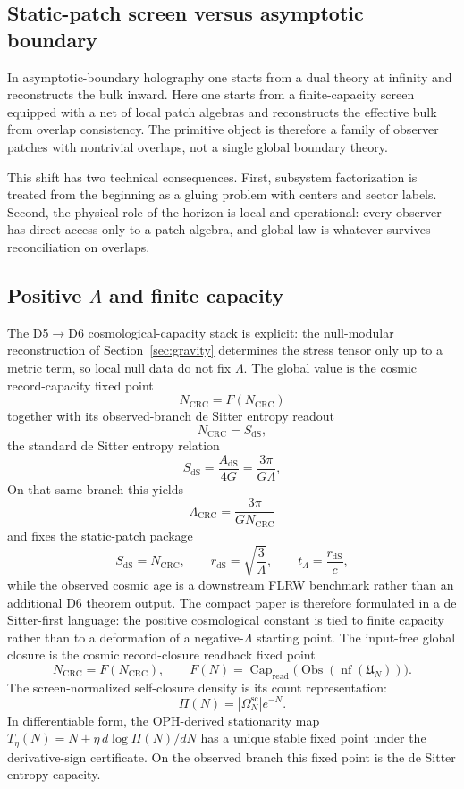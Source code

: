 \documentclass[11pt]{article}
\begin{document}
\subsection{Static-patch screen versus asymptotic boundary}

In asymptotic-boundary holography one starts from a dual theory at infinity and reconstructs the bulk inward. Here one starts from a finite-capacity screen equipped with a net of local patch algebras and reconstructs the effective bulk from overlap consistency. The primitive object is therefore a family of observer patches with nontrivial overlaps, not a single global boundary theory.

This shift has two technical consequences. First, subsystem factorization is treated from the beginning as a gluing problem with centers and sector labels. Second, the physical role of the horizon is local and operational: every observer has direct access only to a patch algebra, and global law is whatever survives reconciliation on overlaps.

\subsection{Positive $\Lambda$ and finite capacity}

The D5\(\to\)D6 cosmological-capacity stack is explicit: the null-modular reconstruction of Section~\ref{sec:gravity} determines the stress tensor only up to a metric term, so local null data do not fix $\Lambda$. The global value is the cosmic record-capacity fixed point
\[
N_{\mathrm{CRC}}=F(N_{\mathrm{CRC}})
\]
together with its observed-branch de Sitter entropy readout
\[
N_{\mathrm{CRC}}=S_{\mathrm{dS}},
\]
\noindent the standard de Sitter entropy relation
\[
S_{\mathrm{dS}}=\frac{A_{\mathrm{dS}}}{4G}=\frac{3\pi}{G\Lambda},
\]
On that same branch this yields
\[
\Lambda_{\mathrm{CRC}}=\frac{3\pi}{G N_{\mathrm{CRC}}}
\]
and fixes the static-patch package
\[
S_{\mathrm{dS}}=N_{\mathrm{CRC}},
\qquad
r_{\mathrm{dS}}=\sqrt{\frac{3}{\Lambda}},
\qquad
t_\Lambda=\frac{r_{\mathrm{dS}}}{c},
\]
while the observed cosmic age is a downstream FLRW benchmark rather than an additional D6 theorem output. The compact paper is therefore formulated in a de Sitter-first language: the positive cosmological constant is tied to finite capacity rather than to a deformation of a negative-$\Lambda$ starting point.
The input-free global closure is the cosmic record-closure readback fixed point
\[
N_{\mathrm{CRC}}=F(N_{\mathrm{CRC}}),
\qquad
F(N)=\operatorname{Cap}_{\mathrm{read}}
\bigl(\operatorname{Obs}(\operatorname{nf}(\mathfrak U_N))\bigr).
\]
The screen-normalized self-closure density is its count representation:
\[
\Pi(N)=|\Omega^{\mathrm{sc}}_N|e^{-N}.
\]
In differentiable form, the OPH-derived stationarity map \(T_\eta(N)=N+\eta\,d\log\Pi(N)/dN\)
has a unique stable fixed point under the derivative-sign certificate. On the observed branch this
fixed point is the de Sitter entropy capacity.
\end{document}
